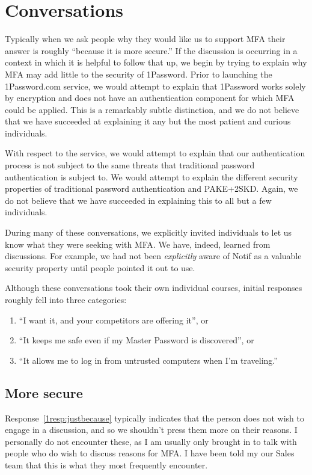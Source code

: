 \documentclass{soups}
\newcommand{\prop}[1]{\textsf{#1}}
\begin{document}
\section{Conversations}

Typically when we ask people why they would like us to support MFA their answer is roughly “because it is more secure.” 
If the discussion is occurring in a context in which it is helpful to follow that up,
we begin by trying to explain why MFA may add little to the security of 1Password.
Prior to launching the 1Password.com service, we would attempt to explain that
1Password works solely by encryption and does not have an authentication component for which MFA could be applied.
This is a remarkably subtle distinction,
and we do not believe that we have succeeded at explaining it any but the
most patient and curious individuals.

With respect to the service, we would attempt to explain that our authentication process is not subject to the same threats that traditional password authentication is subject to.
We would attempt to explain the different security properties of traditional password authentication and PAKE+2SKD.
Again, we do not believe that we have succeeded in explaining this to all but
a few individuals.

During many of these conversations,
we explicitly invited individuals to let us know what they were seeking with MFA\@.
We have, indeed, learned from discussions.
For example, we had not been \emph{explicitly} aware of \prop{Notif} as a valuable security property until people pointed it out to use.

Although these conversations took their own individual courses,
initial responses roughly fell into three categories:
\begin{enumerate}
  \item “I want it, and your competitors are offering it”, or \label{1resp:justbecause}
  \item “It keeps me safe even if my Master Password is discovered”, or \label{1resp:FS}
  \item “It allows me to log in from untrusted computers when I'm traveling.”\label{1resp:CSec}
\end{enumerate}

\subsection{More secure}
Response~\ref{1resp:justbecause} typically indicates that the person does not wish to engage in a discussion, and so we shouldn't press them more on their reasons.
I personally do not encounter these, as I am usually only brought in to talk with people who do wish to discuss reasons for MFA\@.
I have been told my our Sales team that this is what they most frequently encounter.
\end{document}
